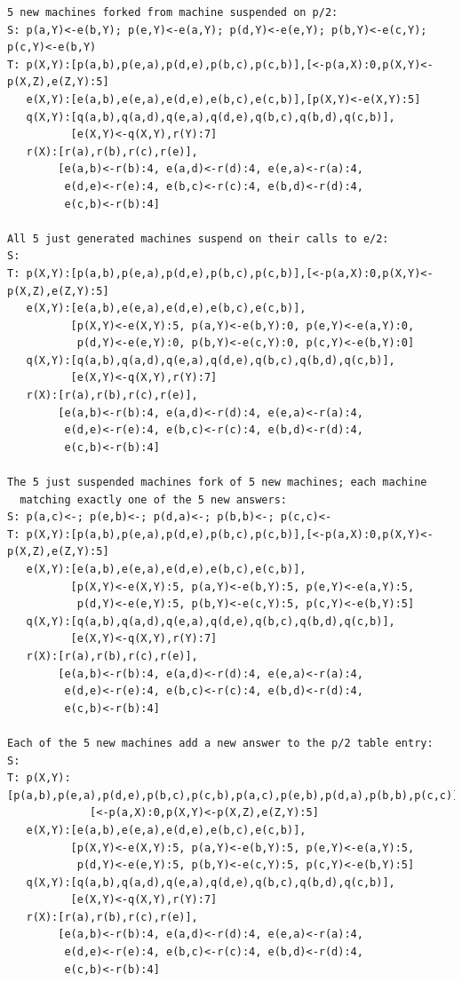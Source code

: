 \begin{verbatim}
5 new machines forked from machine suspended on p/2:
S: p(a,Y)<-e(b,Y); p(e,Y)<-e(a,Y); p(d,Y)<-e(e,Y); p(b,Y)<-e(c,Y); p(c,Y)<-e(b,Y)        
T: p(X,Y):[p(a,b),p(e,a),p(d,e),p(b,c),p(c,b)],[<-p(a,X):0,p(X,Y)<-p(X,Z),e(Z,Y):5]
   e(X,Y):[e(a,b),e(e,a),e(d,e),e(b,c),e(c,b)],[p(X,Y)<-e(X,Y):5]
   q(X,Y):[q(a,b),q(a,d),q(e,a),q(d,e),q(b,c),q(b,d),q(c,b)],
          [e(X,Y)<-q(X,Y),r(Y):7]
   r(X):[r(a),r(b),r(c),r(e)],
        [e(a,b)<-r(b):4, e(a,d)<-r(d):4, e(e,a)<-r(a):4,
         e(d,e)<-r(e):4, e(b,c)<-r(c):4, e(b,d)<-r(d):4,
         e(c,b)<-r(b):4]

All 5 just generated machines suspend on their calls to e/2:
S: 
T: p(X,Y):[p(a,b),p(e,a),p(d,e),p(b,c),p(c,b)],[<-p(a,X):0,p(X,Y)<-p(X,Z),e(Z,Y):5]
   e(X,Y):[e(a,b),e(e,a),e(d,e),e(b,c),e(c,b)],
          [p(X,Y)<-e(X,Y):5, p(a,Y)<-e(b,Y):0, p(e,Y)<-e(a,Y):0,
           p(d,Y)<-e(e,Y):0, p(b,Y)<-e(c,Y):0, p(c,Y)<-e(b,Y):0]
   q(X,Y):[q(a,b),q(a,d),q(e,a),q(d,e),q(b,c),q(b,d),q(c,b)],
          [e(X,Y)<-q(X,Y),r(Y):7]
   r(X):[r(a),r(b),r(c),r(e)],
        [e(a,b)<-r(b):4, e(a,d)<-r(d):4, e(e,a)<-r(a):4,
         e(d,e)<-r(e):4, e(b,c)<-r(c):4, e(b,d)<-r(d):4,
         e(c,b)<-r(b):4]

The 5 just suspended machines fork of 5 new machines; each machine
  matching exactly one of the 5 new answers:
S: p(a,c)<-; p(e,b)<-; p(d,a)<-; p(b,b)<-; p(c,c)<-
T: p(X,Y):[p(a,b),p(e,a),p(d,e),p(b,c),p(c,b)],[<-p(a,X):0,p(X,Y)<-p(X,Z),e(Z,Y):5]
   e(X,Y):[e(a,b),e(e,a),e(d,e),e(b,c),e(c,b)],
          [p(X,Y)<-e(X,Y):5, p(a,Y)<-e(b,Y):5, p(e,Y)<-e(a,Y):5,
           p(d,Y)<-e(e,Y):5, p(b,Y)<-e(c,Y):5, p(c,Y)<-e(b,Y):5]
   q(X,Y):[q(a,b),q(a,d),q(e,a),q(d,e),q(b,c),q(b,d),q(c,b)],
          [e(X,Y)<-q(X,Y),r(Y):7]
   r(X):[r(a),r(b),r(c),r(e)],
        [e(a,b)<-r(b):4, e(a,d)<-r(d):4, e(e,a)<-r(a):4,
         e(d,e)<-r(e):4, e(b,c)<-r(c):4, e(b,d)<-r(d):4,
         e(c,b)<-r(b):4]

Each of the 5 new machines add a new answer to the p/2 table entry:
S:
T: p(X,Y):[p(a,b),p(e,a),p(d,e),p(b,c),p(c,b),p(a,c),p(e,b),p(d,a),p(b,b),p(c,c)],
             [<-p(a,X):0,p(X,Y)<-p(X,Z),e(Z,Y):5]
   e(X,Y):[e(a,b),e(e,a),e(d,e),e(b,c),e(c,b)],
          [p(X,Y)<-e(X,Y):5, p(a,Y)<-e(b,Y):5, p(e,Y)<-e(a,Y):5,
           p(d,Y)<-e(e,Y):5, p(b,Y)<-e(c,Y):5, p(c,Y)<-e(b,Y):5]
   q(X,Y):[q(a,b),q(a,d),q(e,a),q(d,e),q(b,c),q(b,d),q(c,b)],
          [e(X,Y)<-q(X,Y),r(Y):7]
   r(X):[r(a),r(b),r(c),r(e)],
        [e(a,b)<-r(b):4, e(a,d)<-r(d):4, e(e,a)<-r(a):4,
         e(d,e)<-r(e):4, e(b,c)<-r(c):4, e(b,d)<-r(d):4,
         e(c,b)<-r(b):4]


\end{verbatim}
